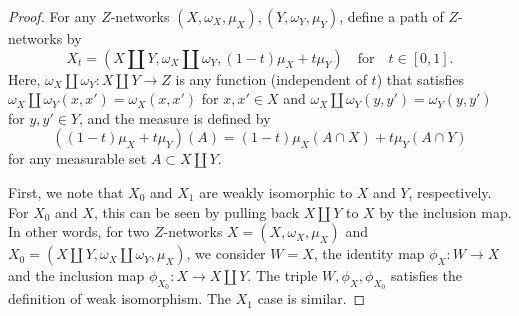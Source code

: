 \documentclass[twoside,11pt]{article}
\theoremstyle{definition}
\begin{document}
\begin{proof}
 For any $Z$-networks $(X,\omega_X, \mu_X), (Y,\omega_Y,\mu_Y)$, define a path of $Z$-networks by 
 \begin{equation}\label{eqn:explicit_path}
 X_t = (X\amalg Y, \omega_X \amalg \omega_Y, (1-t)\mu_X+t\mu_Y) \quad \mbox{for} \quad t\in [0,1]. 
 \end{equation}
 Here, $\omega_X \amalg \omega_Y: X\amalg Y\to Z$ is any function (independent of $t$) that satisfies $\omega_X \amalg \omega_Y(x,x') = \omega_X(x,x')$ for $x,x' \in X$ and $\omega_X \amalg \omega_Y(y,y') = \omega_Y(y,y')$ for $y,y' \in Y$, and the measure is defined by 
 \[
 ((1-t)\mu_X+t\mu_Y)(A) = (1-t)\mu_X(A\cap X) + t\mu_Y(A\cap Y)
 \]
 for any measurable set $A\subset X\amalg Y$. 
 
 First, we note that $X_0$ and $X_1$ are weakly isomorphic to $X$ and $Y$, respectively. For $X_0$ and $X$, this can be seen by pulling back $X\amalg Y$ to $X$ by the inclusion map. In other words, for two $Z$-networks $X=(X,\omega_X,\mu_X)$ and $X_0=(X\amalg Y, \omega_X\amalg \omega_Y, \mu_X)$, we consider $W=X$, the identity map $\phi_X:W\to X$ and the inclusion map $\phi_{X_0}:X\to X\amalg Y$. The triple $W,\phi_X,\phi_{X_0}$ satisfies the definition of weak isomorphism. The $X_1$ case is similar.
 

\end{proof}
\end{document}
